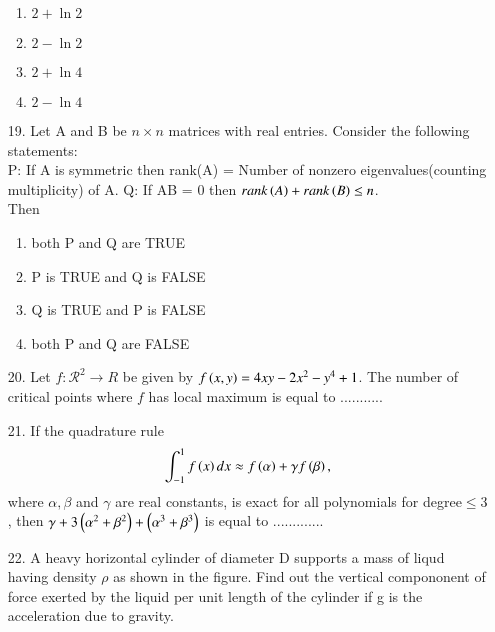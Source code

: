 \documentclass[journal]{IEEEtran}
\begin{document}
\begin{enumerate}
    \begin{enumerate}[label = (\Alph*)]
        \item $2+\ln 2$
        \item $2-\ln 2$
        \item $2+\ln 4$
        \item $2-\ln 4$
    \end{enumerate}
    \item[19.] Let A and B be $n\times n$ matrices with real entries. Consider the following statements:\\
    P: If A is symmetric then rank(A) = Number of nonzero eigenvalues(counting multiplicity) of A.
    Q: If AB = 0 then $rank\left(A\right) + rank\left(B\right)\leq n$.\\
    Then 
    \begin{enumerate}[label = (\Alph*)]
        \item both P and Q are TRUE
        \item P is TRUE and Q is FALSE 
        \item Q is TRUE and P is FALSE
        \item both P and Q are FALSE  
    \end{enumerate}
    \item[20.] Let $f:\mathcal{R}^2\to R$ be given by $f\left(x,y\right) = 4xy-2x^2-y^4+1$. The number of critical points where $f$ has local maximum is equal to ...........
    \item[21.] If the quadrature rule $$\int_{-1}^{1}f\left(x\right)dx\approx f\left(\alpha\right) + \gamma f\left(\beta\right),$$ where $\alpha,\beta$ and $\gamma$ are real constants, is exact for all polynomials for degree$\leq 3$, then $\gamma + 3\left(\alpha^2 + \beta^2\right) + \left(\alpha^3 + \beta^3\right)$ is equal to .............
    \item[22.] A heavy horizontal cylinder of diameter D supports a mass of liqud having density $\rho$ as shown in the figure. Find out the vertical compononent of force exerted by the liquid per unit length of the cylinder if g is the acceleration due to gravity.
    \begin{figure}[!ht]
        \centering
\end{figure}
\end{enumerate}
\end{document}
